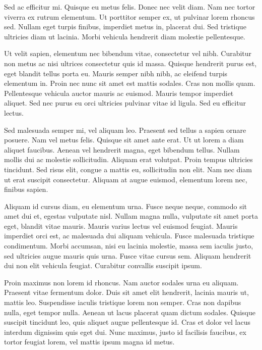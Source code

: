 \documentclass[11pt,english,]{memoir}
\begin{document}
Sed ac efficitur mi. Quisque eu metus felis. Donec nec velit diam. Nam nec tortor viverra ex rutrum elementum. Ut porttitor semper ex, ut pulvinar lorem rhoncus sed. Nullam eget turpis finibus, imperdiet metus in, placerat dui. Sed tristique ultricies diam ut lacinia. Morbi vehicula hendrerit diam molestie pellentesque.

Ut velit sapien, elementum nec bibendum vitae, consectetur vel nibh. Curabitur non metus ac nisi ultrices consectetur quis id massa. Quisque hendrerit purus est, eget blandit tellus porta eu. Mauris semper nibh nibh, ac eleifend turpis elementum in. Proin nec nunc sit amet est mattis sodales. Cras non mollis quam. Pellentesque vehicula auctor mauris ac euismod. Mauris tempor imperdiet aliquet. Sed nec purus eu orci ultricies pulvinar vitae id ligula. Sed eu efficitur lectus.

Sed malesuada semper mi, vel aliquam leo. Praesent sed tellus a sapien ornare posuere. Nam vel metus felis. Quisque sit amet ante erat. Ut ut lorem a diam aliquet faucibus. Aenean vel hendrerit magna, eget bibendum tellus. Nullam mollis dui ac molestie sollicitudin. Aliquam erat volutpat. Proin tempus ultricies tincidunt. Sed risus elit, congue a mattis eu, sollicitudin non elit. Nam nec diam ut erat suscipit consectetur. Aliquam at augue euismod, elementum lorem nec, finibus sapien.

Aliquam id cursus diam, eu elementum urna. Fusce neque neque, commodo sit amet dui et, egestas vulputate nisl. Nullam magna nulla, vulputate sit amet porta eget, blandit vitae mauris. Mauris varius lectus vel euismod feugiat. Mauris imperdiet orci est, ac malesuada dui aliquam vehicula. Fusce malesuada tristique condimentum. Morbi accumsan, nisi eu lacinia molestie, massa sem iaculis justo, sed ultricies augue mauris quis urna. Fusce vitae cursus sem. Aliquam hendrerit dui non elit vehicula feugiat. Curabitur convallis suscipit ipsum.

Proin maximus non lorem id rhoncus. Nam auctor sodales urna eu aliquam. Praesent vitae fermentum dolor. Duis sit amet elit hendrerit, lacinia mauris ut, mattis leo. Suspendisse iaculis tristique lorem non semper. Cras non dapibus nulla, eget tempor nulla. Aenean ut lacus placerat quam dictum sodales. Quisque suscipit tincidunt leo, quis aliquet augue pellentesque id. Cras et dolor vel lacus interdum dignissim quis eget dui. Nunc maximus, justo id facilisis faucibus, ex tortor feugiat lorem, vel mattis ipsum magna id metus.
\end{document}
